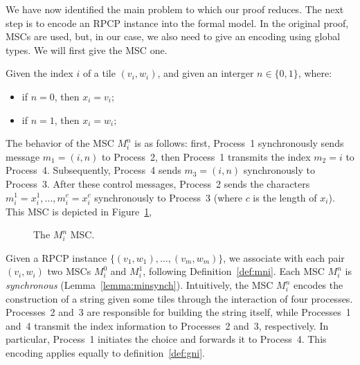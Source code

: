 \bigskip

We have now identified the main problem to which our proof reduces.  
The next step is to encode an RPCP instance into the formal model.
In the original proof, MSCs are used, but, in our case, we also need to give
an encoding using global types. We will first give the MSC one.

\bigskip

\begin{definition}[$M^n_i$]\label{def:mni}
	Given the index $i$ of a tile $(v_i, w_i)$, and
	given an interger $n\in\{0,1\}$, where:
	\begin{itemize}
		\item if $n=0$, then $x_i=v_i$;
		\item if $n=1$, then $x_i=w_i$;
	\end{itemize}
	The behavior of the MSC $M^n_i$ is as follows:
	first, Process~1 synchronously sends message
	$m_1 = (i, n)$ to Process~2, then Process~1 transmits the index $m_2=i$
	to Process~4. Subsequently, Process~4 sends $m_3 = (i, n)$
	synchronously to Process~3. After these control messages, Process~2
	sends the characters $m_i^1 = x_i^1,..., m_i^c = x_i^c$
	synchronously to Process~3 (where $c$ is the length of $x_i$).
	This MSC is depicted in Figure~\ref{fig:mni}, 

	\begin{figure}[!ht]
		\centering
		\begin{msc}[draw frame=none, draw head=none, msc keyword=, head height=0px, label distance=0.5ex, foot height=0px, foot distance=0px]{}

		\end{msc}
		\caption{The $M_i^n$ MSC.}
		\label{fig:mni}
	\end{figure}

\end{definition}

Given a RPCP instance $\{(v_1,w_1),\ldots,(v_m,w_m)\}$, we associate  
with each pair $(v_i,w_i)$ two MSCs $M^0_i$ and $M^1_i$, following  
Definition~\ref{def:mni}. Each MSC $M^n_i$ is \emph{synchronous}  
(Lemma~\ref{lemma:minsynch}). Intuitively, the MSC $M_i^n$ encodes the  
construction of a string given some tiles through the interaction of four processes.  
Processes~2 and~3 are responsible for building the string itself,  
while Processes~1 and~4 transmit the index information to Processes~2  
and~3, respectively. In particular, Process~1 initiates the choice and  
forwards it to Process~4. This encoding applies equally to definition~\ref{def:gni}.


